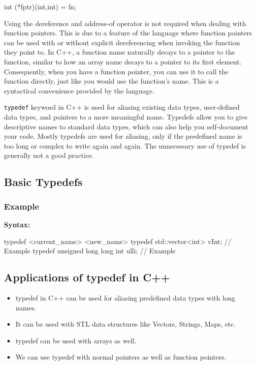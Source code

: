 \documentclass{report}
\begin{document}
\begin{concept}
\begin{cppcode}
        int (*fptr)(int,int) = fn;
    \end{cppcode}
    \bigbreak \noindent 
    \begin{notebox}
       Using the dereference and address-of operator is not required when dealing with function pointers. This is due to a feature of the language where function pointers can be used with or without explicit dereferencing when invoking the function they point to. 
       \bigbreak \noindent 
       In C++, a function name naturally decays to a pointer to the function, similar to how an array name decays to a pointer to its first element. Consequently, when you have a function pointer, you can use it to call the function directly, just like you would use the function's name. This is a syntactical convenience provided by the language.
    \end{notebox}
    


    \pagebreak 
    \bigbreak \noindent 
    \begin{concept}
        \texttt{typedef} keyword in C++ is used for aliasing existing data types, user-defined data types, and pointers to a more meaningful name. Typedefs allow you to give descriptive names to standard data types, which can also help you self-document your code. Mostly typedefs are used for aliasing, only if the predefined name is too long or complex to write again and again.  The unnecessary use of typedef is generally not a good practice.
    \end{concept}
    \bigbreak \noindent 
    \subsection{Basic Typedefs}
    \bigbreak \noindent 
    \subsubsection{Example}
    \bigbreak \noindent 
    \textbf{Syntax:}
    \bigbreak \noindent 
    \begin{cppcode}
    typedef <current_name> <new_name>
    typedef std::vector<int> vInt; // Example
    typedef unsigned long long int ulli;  // Example
    \end{cppcode}
    \bigbreak \noindent 
    \subsection{Applications of typedef in C++}
    \bigbreak \noindent 
    \begin{itemize}
        \item typedef in C++ can be used for aliasing predefined data types with long names.
        \item It can be used with STL data structures like Vectors, Strings, Maps, etc.
        \item typedef can be used with arrays as well.
        \item We can use typedef with normal pointers as well as function pointers.
    \end{itemize}
    \bigbreak \noindent 

\end{concept}
\end{document}
